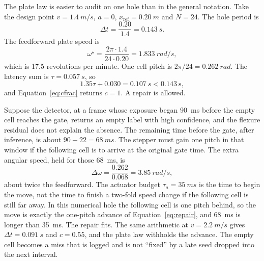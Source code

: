 The plate law is easier to audit on one hole than in the general notation. Take the design point \(v=\SI{1.4}{m/s}\), \(a=0\), \(x_{\mathrm{ref}}=\SI{0.20}{m}\) and \(N=24\). The hole period is
\begin{equation}
\label{eq:dtnum}
\Delta t = \frac{0.20}{1.4} = \SI{0.143}{s}.
\end{equation}
The feedforward plate speed is
\begin{equation}
\label{eq:omeganum}
\omega^{\star} = \frac{2\pi \cdot 1.4}{24 \cdot 0.20} = \SI{1.833}{rad/s},
\end{equation}
which is \num{17.5} revolutions per minute. One cell pitch is \(2\pi/24=\SI{0.262}{rad}\). The latency sum is \(\tau=\SI{0.057}{s}\), so
\begin{equation}
\label{eq:cnum}
1.35\tau + 0.030 = \SI{0.107}{s} < 0.143~\text{s},
\end{equation}
and Equation~\eqref{eq:cfrac} returns \(c=1\). A repair is allowed.

Suppose the detector, at a frame whose exposure began \SI{90}{ms} before the empty cell reaches the gate, returns an empty label with high confidence, and the flexure residual does not explain the absence. The remaining time before the gate, after inference, is about \(90-22=\SI{68}{ms}\). The stepper must gain one pitch in that window if the following cell is to arrive at the original gate time. The extra angular speed, held for those \SI{68}{ms}, is
\begin{equation}
\label{eq:domega}
\Delta\omega = \frac{0.262}{0.068} = \SI{3.85}{rad/s},
\end{equation}
about twice the feedforward. The actuator budget \(\tau_a=\SI{35}{ms}\) is the time to begin the move, not the time to finish a two-fold speed change if the following cell is still far away. In this numerical hole the following cell is one pitch behind, so the move is exactly the one-pitch advance of Equation~\eqref{eq:repair}, and \SI{68}{ms} is longer than \SI{35}{ms}. The repair fits. The same arithmetic at \(v=\SI{2.2}{m/s}\) gives \(\Delta t=\SI{0.091}{s}\) and \(c=0.55\), and the plate law withholds the advance. The empty cell becomes a miss that is logged and is not ``fixed'' by a late seed dropped into the next interval.

